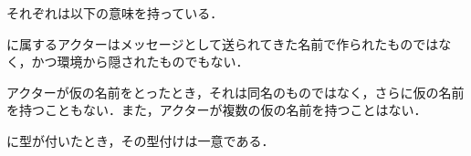 それぞれは以下の意味を持っている．

\begin{description}[style=nextline]
  \item[\recep の健全性]
    \recep に属するアクターはメッセージとして送られてきた名前で作られたものではなく，かつ環境から隠されたものでもない．
  \item[仮名の取り方の健全性]
    アクターが仮の名前をとったとき，それは同名のものではなく，さらに仮の名前を持つこともない．また，アクターが複数の仮の名前を持つことはない．
  \item[型付けの一意性]
    \conf に型が付いたとき，その型付けは一意である．
\end{description}














